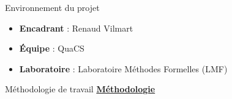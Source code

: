 \documentclass[french, 12pt]{beamer}
\begin{document}
\begin{frame}{Environnement du projet}
\begin{itemize}
    \item \textbf{Encadrant} : Renaud Vilmart
    \item \textbf{Équipe} : QuaCS
    \item \textbf{Laboratoire} : Laboratoire Méthodes Formelles (LMF)
\end{itemize}
\end{frame}

\begin{frame}{Méthodologie de travail}
\underline{\textbf{Méthodologie}}
\small{
\begin{center}
\end{center}
}
\end{frame}
\end{document}
